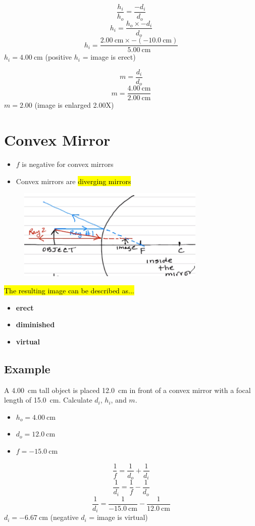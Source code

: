 \documentclass[a4paper,12pt]{article}
\begin{document}
$$\frac{h_i}{h_o} = \frac{-d_i}{d_o}$$
$$h_i = \frac{h_o \times -d_i}{d_o}$$
$$h_i = \frac{\SI{2.00}{\cm} \times -(\SI{-10.0}{\cm})}{\SI{5.00}{\cm}}$$
$h_i = \SI{4.00}{\cm}$ (positive $h_i$ = image is erect)

$$m = \frac{d_i}{d_o}$$
$$m = \frac{\SI{4.00}{\cm}}{\SI{2.00}{\cm}}$$
$m = \num{2.00}$ (image is enlarged 2.00X)

\pagebreak
\section{Convex Mirror}
\begin{itemize}
    \item{$f$ is negative for convex mirrors}
    \item{Convex mirrors are \hl{diverging mirrors}}
\end{itemize}

\begin{figure}[H]
    \centering
    \includegraphics[width=0.8\textwidth]{convex-mirror}
\end{figure}
\hl{The resulting image can be described as...}
\begin{itemize}
    \item{\textbf{erect}}
    \item{\textbf{diminished}}
    \item{\textbf{virtual}}
\end{itemize}

\subsection{Example}
A \SI{4.00}{\cm} tall object is placed \SI{12.0}{\cm} in front of a convex mirror with a focal length of \SI{15.0}{\cm}. Calculate $d_i$, $h_i$, and $m$.
\begin{itemize}
    \item{$h_o = \SI{4.00}{\cm}$}
    \item{$d_o = \SI{12.0}{\cm}$}
    \item{$f = \SI{-15.0}{\cm}$}
\end{itemize}
$$\frac{1}{f} = \frac{1}{d_o} + \frac{1}{d_i}$$
$$\frac{1}{d_i} = \frac{1}{f} - \frac{1}{d_o}$$
$$\frac{1}{d_i} = \frac{1}{\SI{-15.0}{\cm}} - \frac{1}{\SI{12.0}{\cm}}$$
$d_i = \SI{-6.67}{\cm}$ (negative $d_i$ = image is virtual)
\end{document}
